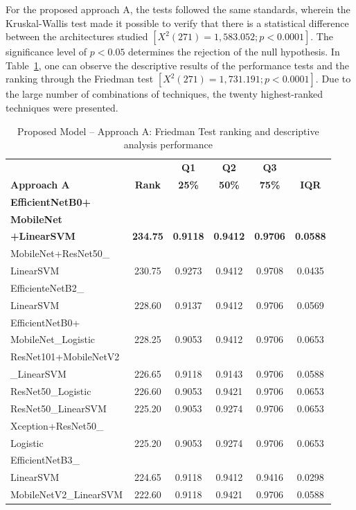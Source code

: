 \documentclass[preprint,12pt]{elsarticle}
\begin{document}
For the proposed approach A, the tests followed the same standards, wherein the Kruskal-Wallis test made it possible to verify that there is a statistical difference between the architectures studied $[X^2(271)=1,583.052; p<0.0001]$. The significance level of $p<0.05$ determines the rejection of the null hypothesis. In Table~\ref{tab:Approach_A_ranking}, one can observe the descriptive results of the performance tests and the ranking through the Friedman test $[X^2(271)=1,731.191; p<0.0001]$. Due to the large number of combinations of techniques, the twenty highest-ranked techniques were presented.

\begin{table}[h!]
	\caption{Proposed Model – Approach A: Friedman Test ranking and descriptive analysis performance}
	\label{tab:Approach_A_ranking}
	\centering
	\begin{tabular}{|l|c|c|c|c|c|}
		\hline
		\textbf{} & \textbf{} & \textbf{Q1} & \textbf{Q2} & \textbf{Q3} & \textbf{} \\
		\textbf{Approach A} & \textbf{Rank} & \textbf{25\%} & \textbf{50\%} & \textbf{75\%} & \textbf{IQR} \\
		\hline
		\textbf{EfficientNetB0+} & & & & & \\
		\textbf{MobileNet} & & & & & \\
		\textbf{+LinearSVM} & \textbf{234.75} & \textbf{0.9118} & \textbf{0.9412} & \textbf{0.9706} & \textbf{0.0588} \\
		MobileNet+ResNet50\_ & & & & & \\
		LinearSVM & 230.75 & 0.9273 & 0.9412 & 0.9708 & 0.0435 \\
		EfficienteNetB2\_ & & & & & \\
		LinearSVM & 228.60 & 0.9137 & 0.9412 & 0.9706 & 0.0569 \\
		EfficientNetB0+ & & & & & \\
		MobileNet\_Logistic & 228.25 & 0.9053 & 0.9412 & 0.9706 & 0.0653 \\
		ResNet101+MobileNetV2 & & & & & \\
		\_LinearSVM & 226.65 & 0.9118 & 0.9143 & 0.9706 & 0.0588 \\
		ResNet50\_Logistic & 226.60 & 0.9053 & 0.9421 & 0.9706 & 0.0653 \\
		ResNet50\_LinearSVM & 225.20 & 0.9053 & 0.9274 & 0.9706 & 0.0653 \\
		Xception+ResNet50\_ & & & & & \\
		Logistic & 225.20 & 0.9053 & 0.9274 & 0.9706 & 0.0653 \\
		EfficientNetB3\_ & & & & & \\
		LinearSVM & 224.65 & 0.9118 & 0.9412 & 0.9416 & 0.0298 \\
		MobileNetV2\_LinearSVM & 222.60 & 0.9118 & 0.9421 & 0.9706 & 0.0588 \\
		\hline
	\end{tabular}
\end{table}
\end{document}
